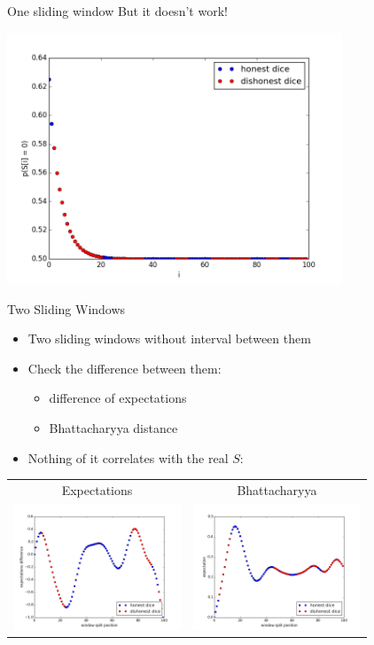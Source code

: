 \documentclass[hyperref=unicode,graphics=pdflatex,13pt]{beamer}
\begin{document}
\begin{frame}{One sliding window}
 But it doesn't work!
 
 \includegraphics[width = 10cm]{one_window_probabilities.png}
\end{frame}


\begin{frame}{Two Sliding Windows}
\begin{itemize}
   \item Two sliding windows without interval between them
   \item Check the difference between them:
   \begin{itemize}
      \item difference of expectations
      \item Bhattacharyya distance
   \end{itemize}
   \item Nothing of it correlates with the real $S$:
\end{itemize}
\begin{tabular}{cc}
 Expectations & Bhattacharyya \\
 \includegraphics[width = 5cm]{two_windows_expectation.png} &
 \includegraphics[width = 5cm]{two_windows_bhattacharyya.png}
\end{tabular}


\end{frame}
\end{document}
